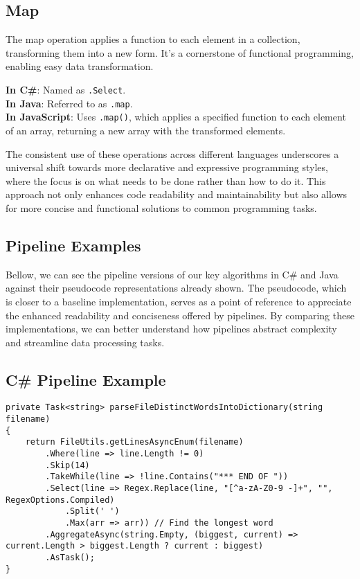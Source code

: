 \subsection*{Map}
The map operation applies a function to each element in a collection, transforming them into a new form. It's a cornerstone of functional programming, enabling easy data transformation.

\textbf{In C\#}: Named as \texttt{.Select}. \\
\textbf{In Java}: Referred to as \texttt{.map}. \\
\textbf{In JavaScript}: Uses \texttt{.map()}, which applies a specified function to each element of an array, returning a new array with the transformed elements.

The consistent use of these operations across different languages underscores a universal shift towards more declarative and expressive programming styles, where the focus is on what needs to be done rather than how to do it. This approach not only enhances code readability and maintainability but also allows for more concise and functional solutions to common programming tasks.

\subsection{Pipeline Examples}
Bellow, we can see the pipeline versions of our key algorithms in C\# and Java against their pseudocode representations already shown. The pseudocode, which is closer to a baseline implementation, serves as a point of reference to appreciate the enhanced readability and conciseness offered by pipelines. By comparing these implementations, we can better understand how pipelines abstract complexity and streamline data processing tasks.

\clearpage

\lstset{basicstyle=\footnotesize\ttfamily} %

\subsection*{C\# Pipeline Example}

\begin{lstlisting}[language={[Sharp]C}, caption={C\# Pipeline for Parsing Distinct Words into a Dictionary}]
private Task<string> parseFileDistinctWordsIntoDictionary(string filename)
{
    return FileUtils.getLinesAsyncEnum(filename)
        .Where(line => line.Length != 0)   
        .Skip(14)                          
        .TakeWhile(line => !line.Contains("*** END OF ")) 
        .Select(line => Regex.Replace(line, "[^a-zA-Z0-9 -]+", "", RegexOptions.Compiled)
            .Split(' ')
            .Max(arr => arr)) // Find the longest word
        .AggregateAsync(string.Empty, (biggest, current) => current.Length > biggest.Length ? current : biggest) 
        .AsTask();
}
\end{lstlisting}

